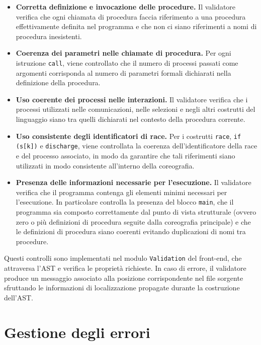 \begin{itemize}

\item \textbf{Corretta definizione e invocazione delle procedure.}  
Il validatore verifica che ogni chiamata di procedura faccia riferimento a una procedura effettivamente definita nel programma e che non ci siano riferimenti a nomi di procedura inesistenti.

\item \textbf{Coerenza dei parametri nelle chiamate di procedura.}  
Per ogni istruzione \texttt{call}, viene controllato che il numero di processi passati come argomenti corrisponda al numero di parametri formali dichiarati nella definizione della procedura.

\item \textbf{Uso coerente dei processi nelle interazioni.}  
Il validatore verifica che i processi utilizzati nelle comunicazioni, nelle selezioni e negli altri costrutti del linguaggio siano tra quelli dichiarati nel contesto della procedura corrente.

\item \textbf{Uso consistente degli identificatori di race.}  
Per i costrutti \texttt{race}, \texttt{if (s[k])} e \texttt{discharge}, viene controllata la coerenza dell’identificatore della race e del processo associato, in modo da garantire che tali riferimenti siano utilizzati in modo consistente all’interno della coreografia.

\item \textbf{Presenza delle informazioni necessarie per l’esecuzione.}  
Il validatore verifica che il programma contenga gli elementi minimi necessari per l’esecuzione. In particolare controlla la presenza del blocco \texttt{main}, che il programma sia composto correttamente dal punto di vista strutturale (ovvero zero o più definizioni di procedura seguite dalla coreografia principale) e che le definizioni di procedura siano coerenti evitando duplicazioni di nomi tra procedure.
\end{itemize}

Questi controlli sono implementati nel modulo \texttt{Validation} del front-end, che attraversa l’AST e verifica le proprietà richieste. In caso di errore, il validatore produce un messaggio associato alla posizione corrispondente nel file sorgente sfruttando le informazioni di localizzazione propagate durante la costruzione dell’AST.

\section{Gestione degli errori}

